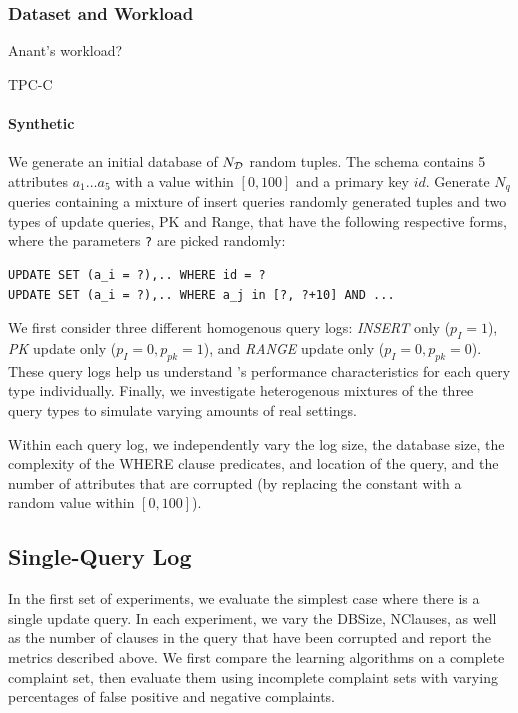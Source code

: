 \subsubsection{Dataset and Workload}

Anant's workload?

TPC-C

\paragraph{Synthetic}

We generate an initial database of $N_{\cal D}$ random tuples.  
The schema contains 5 attributes $a_1\ldots a_5$ with a value
within $[0, 100]$ and a primary key $id$. 
Generate $N_q$ queries containing a mixture of insert queries  randomly generated tuples and two types of update
queries, PK and Range, that have the following respective forms, 
where the parameters \verb|?| are picked randomly:

{\scriptsize
\begin{verbatim}
UPDATE SET (a_i = ?),.. WHERE id = ?
UPDATE SET (a_i = ?),.. WHERE a_j in [?, ?+10] AND ...
\end{verbatim}
}

We first consider three different homogenous query logs: {\it INSERT} only ($p_I = 1$), 
{\it PK} update only ($p_I = 0, p_{pk} = 1$), and {\it RANGE} update only ($p_I = 0, p_{pk} = 0$).
These query logs help us understand \sys's performance characteristics for each query type individually.  
Finally, we investigate heterogenous mixtures of the three query types to simulate varying amounts of real settings.

Within each query log, we independently vary the log size, the
database size, the complexity of the WHERE clause predicates, and
location of the query, and the number of attributes that are corrupted
(by replacing the constant with a random value within $[0, 100]$).





\subsection{Single-Query Log}

In the first set of experiments, we evaluate the simplest case where there
is a single update query.  In each experiment, we vary the DBSize,
NClauses, as well as the number of clauses in the query that have
been corrupted and report the metrics described above.  We first 
compare the learning algorithms on a complete complaint set, then evaluate them
using incomplete complaint sets with varying percentages of false positive and negative complaints.

